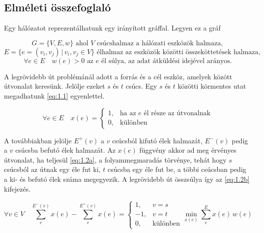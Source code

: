 \documentclass[a4paper,oneside]{article}
\newcommand{\inedge}[1]{E^-(#1)}
\newcommand{\outedge}[1]{E^+(#1)}
\begin{document}
\subsection{Elméleti összefoglaló}

Egy hálózatot reprezentálhatunk egy irányított gráffal. Legyen ez a gráf

$$G = \lbrace V, E, w \rbrace \text{ ahol } V \text{ csúcshalmaz a hálózati eszközök halmaza},$$
$$E = \lbrace e = (v_i, v_j) \, \vert \, v_i, v_j \in V \rbrace \text{ élhalmaz az eszközök közötti összeköttetések halmaza},$$
$$\forall e \in E \quad w(e) > 0 \text{ az $e$ él súlya, az adat átküldési idejével arányos}.$$

A legrövidebb út problémánál adott a forrás és a cél eszköz, amelyek között útvonalat keresünk.
Jelölje ezeket $s$ és $t$ csúcs.
Egy $s$ és $t$ közötti körmentes utat megadhatunk \eqref{eq:1.1} egyenlettel.

\begin{equation}
  \forall e \in E \quad x(e) = \begin{cases}
    1, & \text{ha az $e$ él része az útvonalnak}\\
    0, & \text{különben}
  \end{cases} \label{eq:1.1}
\end{equation}

A továbbiakban jelölje $\outedge{v}$ a $v$ csúcsból kifutó élek halmazát,
$\inedge{v}$ pedig a $v$ csúcsba befutó élek halmazát.
Az $x(e)$ függvény akkor ad meg érvényes útvonalat, ha teljesül \eqref{eq:1.2a}, a folyammegmaradás törvénye,
tehát hogy $s$ csúcsból az útnak egy éle fut ki, $t$ csúcsba egy éle fut be,
a többi csúcsban pedig a ki- és befutó élek száma megegyezik.
A legrövidebb út összsúlya így az \eqref{eq:1.2b} kifejezés.

\begin{subequations}
  \begin{equation}
    \forall v \in V \quad \sum_{e}^{\inedge{v}}x(e) - \sum_{e}^{\outedge{v}}x(e) = \begin{cases}
      1, & v = s \\
      -1, & v = t\\
      0, & \text{különben}
    \end{cases} \label{eq:1.2a}
  \end{equation}
  \begin{equation}
    \min_{x(e)} \sum_{e}^{E} x(e) \, w(e) \label{eq:1.2b}
  \end{equation}
\end{subequations}
\end{document}
